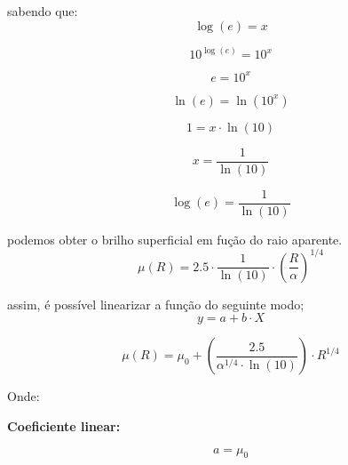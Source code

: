 \documentclass[a4paper, 11pt, fleqn, leqno]{article}
\begin{document}
\noindent sabendo que:\\

\begin{equation*}
	\log{(e)} = x
\end{equation*}

\begin{equation*}
	10^{\log{(e)}} = 10^{x}
\end{equation*}

\begin{equation*}
	e = 10^{x}
\end{equation*}

\begin{equation*}
	\ln{(e)} = \ln{(10^{x})}
\end{equation*}

\begin{equation*}
	1 = x \cdot \ln{(10)}
\end{equation*}

\begin{equation*}
	x = \frac{1}{\ln{(10)}}
\end{equation*}

\begin{equation*}
	\log{(e)} = \frac{1}{\ln{(10)}}
\end{equation*}

\noindent podemos obter o brilho superficial em fução do raio aparente.\\

\begin{equation*}
	\mu(R) = 2.5 \cdot \frac{1}{\ln{(10)}} \cdot \left( \frac{R}{\alpha}\right)^{1/4} 
\end{equation*}

\noindent assim, é possível linearizar a função do seguinte modo;\\

\begin{equation*}
	y = a + b \cdot X 
\end{equation*}

\begin{equation*}
	\mu(R) = \mu_{0} + \left( \frac{2.5}{\alpha^{1/4} \cdot \ln{(10)}} \right) \cdot R^{1/4} 
\end{equation*}

\noindent Onde:

\noindent \textbf{Coeficiente linear:}

\begin{equation*}
	a = \mu_{0}
\end{equation*}
\end{document}
